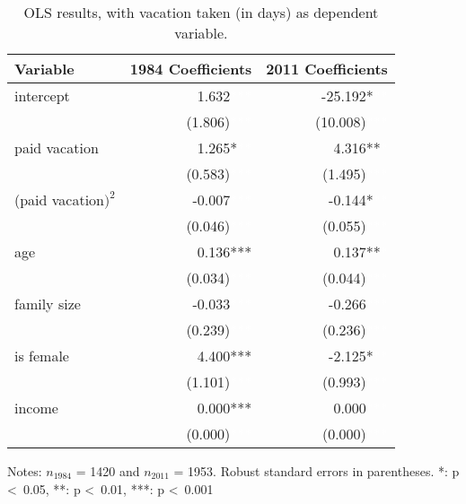 \documentclass{article}
\begin{document}
    \setlength{\extrarowheight}{3pt}
    \begin{table}[h]
    \centering
    \hspace*{-1.5cm}
    \begin{tabular}{l|r|r}
    Variable            &             1984 Coefficients &              2011 Coefficients \\ \hline \hline
    intercept           &   1.632\textcolor{white}{***} &  -25.192*\textcolor{white}{**} \\
                        & (1.806)\textcolor{white}{***} & (10.008)\textcolor{white}{***} \\ \hline
    paid vacation       &   1.265*\textcolor{white}{**} &    4.316**\textcolor{white}{*} \\
                        & (0.583)\textcolor{white}{***} &  (1.495)\textcolor{white}{***} \\ \hline
    (paid vacation$)^2$ &  -0.007\textcolor{white}{***} &   -0.144*\textcolor{white}{**} \\
                        & (0.046)\textcolor{white}{***} &  (0.055)\textcolor{white}{***} \\ \hline
    age                 &   0.136***\textcolor{white}{} &    0.137**\textcolor{white}{*} \\
                        & (0.034)\textcolor{white}{***} &  (0.044)\textcolor{white}{***} \\ \hline
    family size         &  -0.033\textcolor{white}{***} &   -0.266\textcolor{white}{***} \\
                        & (0.239)\textcolor{white}{***} &  (0.236)\textcolor{white}{***} \\ \hline
    is female           &   4.400***\textcolor{white}{} &   -2.125*\textcolor{white}{**} \\
                        & (1.101)\textcolor{white}{***} &  (0.993)\textcolor{white}{***} \\ \hline
    income              &   0.000***\textcolor{white}{} &    0.000\textcolor{white}{***} \\
                        & (0.000)\textcolor{white}{***} &  (0.000)\textcolor{white}{***}
    \end{tabular}
    \hspace*{-1.5cm}
    \caption{OLS results, with vacation taken (in days) as dependent variable.}
    \label{ols}
      Notes: $n_{1984}$ = 1420 and $n_{2011}$ = 1953.
      Robust standard errors in parentheses.
      *: p \textless\ 0.05, **: p \textless\ 0.01, ***: p \textless\ 0.001
    \end{table}
\end{document}
